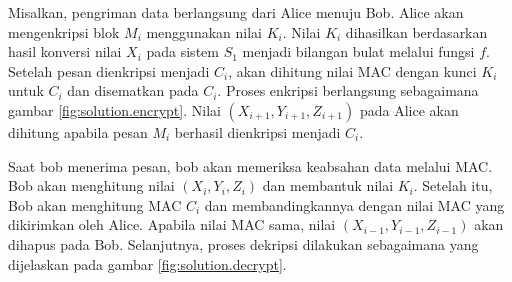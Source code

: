 Misalkan, pengriman data berlangsung dari Alice menuju Bob. Alice akan mengenkripsi blok $M_i$ menggunakan nilai $K_i$. Nilai $K_i$ dihasilkan berdasarkan hasil konversi nilai $X_i$ pada sistem $S_1$ menjadi bilangan bulat melalui fungsi $f$. Setelah pesan dienkripsi menjadi $C_i$, akan dihitung nilai MAC dengan kunci $K_i$ untuk $C_i$ dan disematkan pada $C_i$. Proses enkripsi berlangsung sebagaimana gambar \ref{fig:solution.encrypt}. Nilai $(X_{i+1}, Y_{i+1}, Z_{i+1})$ pada Alice akan dihitung apabila pesan $M_i$ berhasil dienkripsi menjadi $C_i$.  

Saat bob menerima pesan, bob akan memeriksa keabsahan data melalui MAC. Bob akan menghitung nilai $(X_i, Y_i, Z_i)$ dan membantuk nilai $K_i$. Setelah itu, Bob akan menghitung MAC $C_i$ dan membandingkannya dengan nilai MAC yang dikirimkan oleh Alice. Apabila nilai MAC sama, nilai $(X_{i-1}, Y_{i-1}, Z_{i-1})$ akan dihapus pada Bob. Selanjutnya, proses dekripsi dilakukan sebagaimana yang dijelaskan pada gambar \ref{fig:solution.decrypt}.
